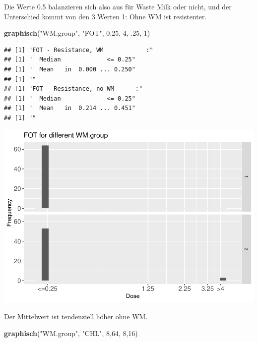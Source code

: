 \documentclass[
]{article}
\newenvironment{Shaded}{\begin{snugshade}}{\end{snugshade}}
\newcommand{\DecValTok}[1]{\textcolor[rgb]{0.00,0.00,0.81}{#1}}
\newcommand{\FloatTok}[1]{\textcolor[rgb]{0.00,0.00,0.81}{#1}}
\newcommand{\KeywordTok}[1]{\textcolor[rgb]{0.13,0.29,0.53}{\textbf{#1}}}
\newcommand{\NormalTok}[1]{#1}
\newcommand{\StringTok}[1]{\textcolor[rgb]{0.31,0.60,0.02}{#1}}
\begin{document}
Die Werte 0.5 balanzieren sich also aus für Waste Milk oder nicht, und
der Unterschied kommt von den 3 Werten 1: Ohne WM ist resistenter.

\begin{Shaded}
\begin{Highlighting}[]
  \KeywordTok{graphisch}\NormalTok{(}\StringTok{"WM.group"}\NormalTok{, }\StringTok{"FOT"}\NormalTok{, }\FloatTok{0.25}\NormalTok{,  }\DecValTok{4}\NormalTok{, }\FloatTok{.25}\NormalTok{, }\DecValTok{1}\NormalTok{)  }
\end{Highlighting}
\end{Shaded}

\begin{verbatim}
## [1] "FOT - Resistance, WM            :"
## [1] "  Median             <= 0.25"
## [1] "  Mean   in  0.000 ... 0.250"
## [1] ""
## [1] "FOT - Resistance, no WM      :"
## [1] "  Median             <= 0.25"
## [1] "  Mean   in  0.214 ... 0.451"
## [1] ""
\end{verbatim}

\includegraphics{Verteilungen_files/figure-latex/unnamed-chunk-38-1.pdf}

Der Mittelwert ist tendenziell höher ohne WM.

\begin{Shaded}
\begin{Highlighting}[]
  \KeywordTok{graphisch}\NormalTok{(}\StringTok{"WM.group"}\NormalTok{, }\StringTok{"CHL"}\NormalTok{, }\DecValTok{8}\NormalTok{,}\DecValTok{64}\NormalTok{, }\DecValTok{8}\NormalTok{,}\DecValTok{16}\NormalTok{) }
\end{Highlighting}
\end{Shaded}
\end{document}
